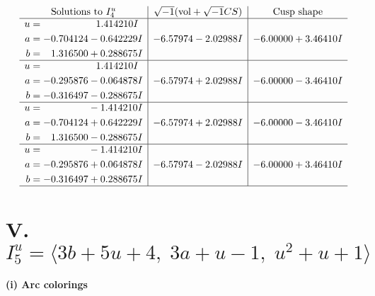 \documentclass[1p]{elsarticle_modified}
\theoremstyle{definition}
\newcommand{\I}{\sqrt{-1}}
\begin{document}
$$\begin{array}{c|c|c}  
\text{Solutions to }I^u_{4}& \I (\text{vol} + \sqrt{-1}CS) & \text{Cusp shape}\\
 \hline 
\begin{aligned}
u &= \phantom{-0.000000 -}1.414210 I \\
a &= -0.704124 - 0.642229 I \\
b &= \phantom{-}1.316500 + 0.288675 I\end{aligned}
 & -6.57974 - 2.02988 I & -6.00000 + 3.46410 I \\ \hline\begin{aligned}
u &= \phantom{-0.000000 -}1.414210 I \\
a &= -0.295876 - 0.064878 I \\
b &= -0.316497 - 0.288675 I\end{aligned}
 & -6.57974 + 2.02988 I & -6.00000 - 3.46410 I \\ \hline\begin{aligned}
u &= \phantom{-0.000000 } -1.414210 I \\
a &= -0.704124 + 0.642229 I \\
b &= \phantom{-}1.316500 - 0.288675 I\end{aligned}
 & -6.57974 + 2.02988 I & -6.00000 - 3.46410 I \\ \hline\begin{aligned}
u &= \phantom{-0.000000 } -1.414210 I \\
a &= -0.295876 + 0.064878 I \\
b &= -0.316497 + 0.288675 I\end{aligned}
 & -6.57974 - 2.02988 I & -6.00000 + 3.46410 I\\
 \hline 
 \end{array}$$\newpage\newpage\renewcommand{\arraystretch}{1}
\centering \section*{V. $I^u_{5}= \langle 3 b+5 u+4,\;3 a+u-1,\;u^2+u+1 \rangle$}
\flushleft \textbf{(i) Arc colorings}\\
\end{document}
